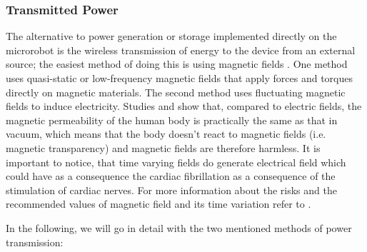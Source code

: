 \subsubsection{Transmitted Power}
The alternative to power generation or storage implemented directly on the microrobot is the wireless transmission of energy to the device from an external source; the easiest method of doing this is using magnetic fields \cite{Nelson2010}. One method uses quasi-static or low-frequency magnetic fields that apply forces and torques directly on magnetic materials. The second method uses fluctuating magnetic fields to induce electricity. Studies \cite{Collins2002} and \cite{Siauve2003} show that, compared to electric fields, the magnetic permeability of the human body is practically the same as that in vacuum, which means that the body doesn't react to magnetic fields (i.e. magnetic transparency) and magnetic fields are therefore harmless. It is important to notice, that time varying fields do generate electrical field which could have as a consequence the cardiac fibrillation as a consequence of the stimulation of cardiac nerves. For more information about the risks and the recommended values of magnetic field and its time variation refer to \cite{Andra2007a}.

In the following, we will go in detail with the two mentioned methods of power transmission:

